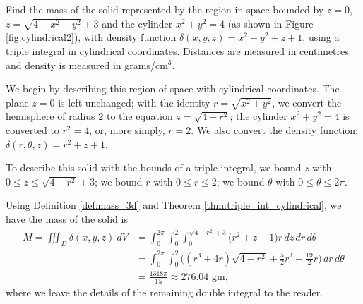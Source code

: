 {Find the mass of the solid represented by the region in space bounded by $z=0$, $z=\sqrt{4-x^2-y^2}+3$ and the cylinder $x^2+y^2=4$ (as shown in Figure \ref{fig:cylindrical2}), with density function $\delta(x,y,z) = x^2+y^2+z+1$, using a triple integral in cylindrical coordinates. Distances are measured in centimetres and density is measured in grams/cm$^3$.
}
{We begin by describing this region of space with cylindrical coordinates. The plane $z=0$ is left unchanged; with the identity $r=\sqrt{x^2+y^2}$, we convert the hemisphere of radius 2 to the equation $z=\sqrt{4-r^2}$; the cylinder $x^2+y^2=4$ is converted to $r^2=4$, or, more simply, $r=2$.  We also convert the density function: $\delta(r,\theta,z) = r^2+z+1$. 
\enlargethispage{1.5\baselineskip}

To describe this solid with the bounds of a triple integral, we bound $z$ with $0\leq z\leq \sqrt{4-r^2}+3$; we bound $r$ with $0 \leq r \leq 2$; we bound $\theta$ with $0 \leq \theta \leq 2\pi$.

Using Definition \ref{def:mass_3d} and Theorem \ref{thm:triple_int_cylindrical}, we have the mass of the solid is
\begin{align*}
M=\iiint_D\delta(x,y,z)\ dV &= \int_0^{2\pi}\int_0^2\int_0^{\sqrt{4-r^2}+3}\big(r^2+z+1\big)r\,dz\,dr\,d\theta \\
&= \int_0^{2\pi}\int_0^2\big((r^3+4r)\sqrt{4-r^2}+\frac52r^3+\frac{19}2r\big)\,dr\,d\theta \\
&= \frac{1318\pi}{15} \approx 276.04\text{ gm},
\end{align*}
where we leave the details of the remaining double integral to the reader.
}\\

